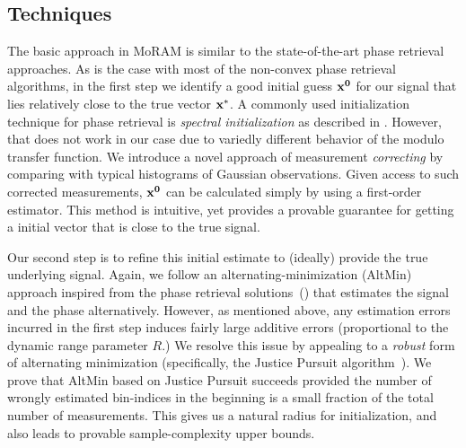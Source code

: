 \subsection{Techniques}

The basic approach in MoRAM is similar to the state-of-the-art phase retrieval approaches. As is the case with most of the non-convex phase retrieval algorithms, in the first step we identify a good initial guess $\mathbf{x^0}$ for our signal that lies relatively close to the true vector $\mathbf{x^*}$. A commonly used initialization technique for phase retrieval is \emph{spectral initialization} as described in \cite{Netrapalli2013}. However, that does not work in our case due to variedly different behavior of the modulo transfer function. %
We introduce a novel approach of measurement \emph{correcting} by comparing with typical histograms of Gaussian observations. Given access to such corrected measurements, $\mathbf{x^0}$ can be calculated simply by using a first-order estimator. This method is intuitive, yet provides %
	a provable guarantee for getting a initial vector that is close to the true signal. 

Our second step is to refine this initial estimate to (ideally) provide the true underlying signal. Again, we follow an alternating-minimization (AltMin) approach inspired from the phase retrieval solutions~(\cite{Netrapalli2013}) that estimates the signal and the phase alternatively. However, as mentioned above, any estimation errors incurred in the first step induces fairly large additive errors (proportional to the dynamic range parameter $R$.) We resolve this issue by appealing to a \emph{robust} form of alternating minimization (specifically, the Justice Pursuit algorithm~\cite{Laska2009}). We prove that AltMin based on Justice Pursuit succeeds provided the number of wrongly estimated bin-indices in the beginning is a small fraction of the total number of measurements. This gives us a natural radius for initialization, and also leads to provable sample-complexity upper bounds.   %

